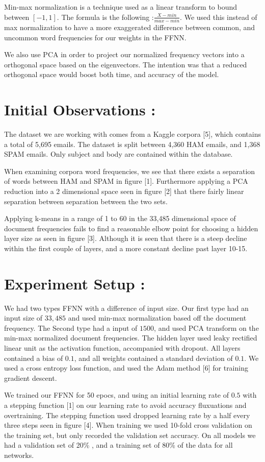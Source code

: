 \documentclass[a4paper,11pt]{article}
\begin{document}
Min-max normalization is a technique used as a linear transform to bound between $[-1,1]$. The formula is the following :$ \frac{X-min}{max-min}$. We used this instead of max normalization to have a more exaggerated difference between common, and uncommon word frequencies for our weights in the FFNN. 

We also use PCA in order to project our normalized frequency vectors into a orthogonal space based on the eigenvectors. The intention was that a reduced orthogonal space would boost both time, and accuracy of the model. 
\section*{Initial Observations :}
The dataset we are working with comes from a Kaggle corpora [5], which contains a total of 5,695 emails. The dataset is split between 4,360 HAM emails, and 1,368 SPAM emails. Only subject and body are contained within the database. 

When examining corpora word frequencies, we see that there exists a separation of words between HAM and SPAM in figure [1].  Furthermore applying a PCA reduction into a 2 dimensional space seen in figure [2] that there fairly linear separation between separation between the two sets. 

Applying k-means in a range of 1 to 60 in the 33,485 dimensional space of document frequencies fails to find a reasonable elbow point for choosing a hidden layer size as seen in figure [3]. Although it is seen that there is a steep decline within the first couple of layers, and a more constant decline past layer 10-15.
\section*{Experiment Setup :}
We had two types FFNN with a difference of input size. Our first type had an input size of $33,485$ and used min-max normalization based off the document frequency. The Second type had a input of $1500$, and used PCA transform on the min-max normalized document frequencies. The hidden layer used leaky rectified linear unit as the activation function, accompanied with dropout. All layers contained a bias of $0.1$, and all weights contained a standard deviation of $0.1$. We used a cross entropy loss function, and used the Adam method [6] for training gradient descent.

We trained our FFNN for 50 epocs, and using an initial learning rate of $0.5$ with a stepping function [1] on our learning rate to avoid accuracy fluxuations and overtraining. The stepping function used dropped learning rate by a half every three steps seen in figure [4].
When training we used 10-fold cross validation on the training set, but only recorded the validation set accuracy. On all models we had a validation set of 20\% , and a training set of 80\% of the data for all networks. 
\end{document}
